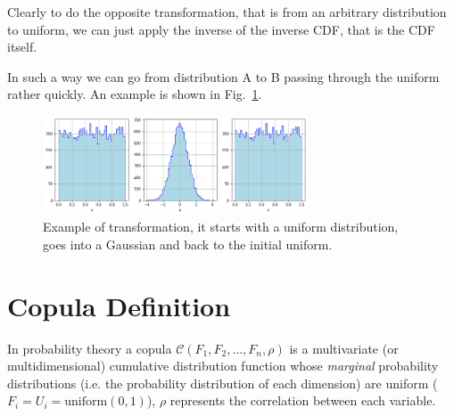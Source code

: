 Clearly to do the opposite transformation, that is from an arbitrary distribution to uniform, we can just apply the inverse of the inverse CDF, that is the CDF itself.

In such a way we can go from distribution A to B passing through the uniform rather quickly. An example is shown in Fig.~\ref{fig:a_to_b_to_a}.

\begin{figure}[htbp]
\centering
\includegraphics[width=0.7\textwidth]{figures/a_to_b_to_a}
\caption{Example of transformation, it starts with a uniform distribution, goes into a Gaussian and back to the initial uniform.}
\label{fig:a_to_b_to_a}
\end{figure}

\section{Copula Definition}
\label{copula}




In probability theory a copula $\mathcal{C}(F_1, F_2, \ldots, F_n, \rho)$ is a multivariate (or multidimensional) cumulative distribution function whose \emph{marginal} probability distributions (i.e. the probability distribution of each dimension) are uniform ($F_i = U_i =\mathrm{uniform}(0,1)$), $\rho$ represents the correlation between each variable.

